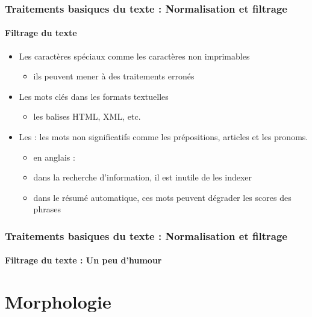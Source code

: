 \documentclass[xcolor=table]{beamer}
\begin{document}
\begin{frame}
\frametitle{Traitements basiques du texte : Normalisation et filtrage}
\framesubtitle{Filtrage du texte}

\begin{itemize}
	\item Les caractères spéciaux comme les caractères non imprimables
	\begin{itemize}
		\item ils peuvent mener à des traitements erronés 
	\end{itemize}
	\item Les mots clés dans les formats textuelles
	\begin{itemize}
		\item les balises HTML, XML, etc. 
	\end{itemize}
	\item Les  : les mots non significatifs comme les prépositions, articles et les pronoms.
	\begin{itemize}
		\item en anglais : 
		\item dans la recherche d'information, il est inutile de les indexer
		\item dans le résumé automatique, ces mots peuvent dégrader les scores des phrases
	\end{itemize}
\end{itemize}

\end{frame}

\begin{frame}
\frametitle{Traitements basiques du texte : Normalisation et filtrage}
\framesubtitle{Filtrage du texte : Un peu d'humour}

\begin{center}
\end{center}

\end{frame}

\section{Morphologie}
\end{document}
